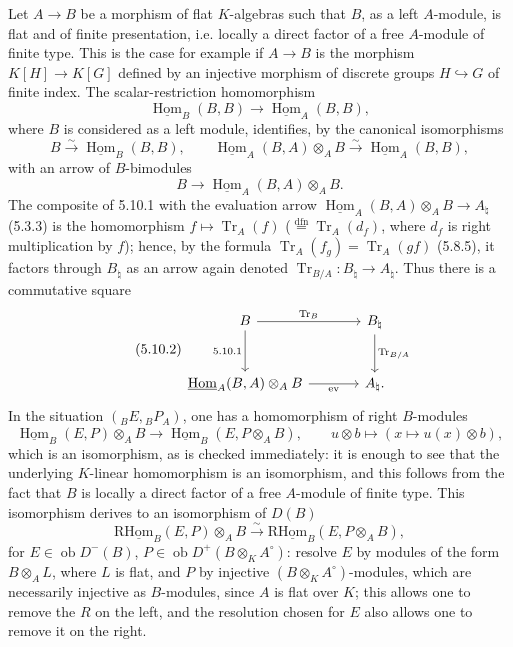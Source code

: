 \documentclass[11pt]{article}
\providecommand{\uHom}{\underline{\Hom}}
\DeclareMathOperator{\Hom}{Hom}
\newcommand{\ob}{\operatorname{ob}}
\providecommand{\Tr}{\operatorname{Tr}}
\providecommand{\Tr}{\operatorname{Tr}}
\providecommand{\Tr}{\operatorname{Tr}}
\providecommand{\Hom}{\operatorname{Hom}}
\providecommand{\ob}{\operatorname{ob}}
\providecommand{\Tr}{\operatorname{Tr}}
\providecommand{\Hom}{\operatorname{Hom}}
\providecommand{\Tr}{\operatorname{Tr}}
\begin{document}
Let $A\to B$ be a morphism of flat $K$-algebras such that $B$, as a left $A$-module, is flat and of finite presentation, i.e. locally a direct factor of a free $A$-module of finite type. This is the case for example if $A\to B$ is the morphism $K[H]\to K[G]$ defined by an injective morphism of discrete groups $H\hookrightarrow G$ of finite index. The scalar-restriction homomorphism
\[
\uHom_B(B,B)\longrightarrow\uHom_A(B,B),
\]
where $B$ is considered as a left module, identifies, by the canonical isomorphisms
\[
B\xrightarrow{\sim}\uHom_B(B,B),\qquad \uHom_A(B,A)\otimes_AB\xrightarrow{\sim}\uHom_A(B,B),
\]
with an arrow of $B$-bimodules
\begin{equation}\tag{5.10.1}
B\longrightarrow\uHom_A(B,A)\otimes_AB.
\end{equation}
The composite of 5.10.1 with the evaluation arrow $\uHom_A(B,A)\otimes_AB\to A_\natural$ (5.3.3) is the homomorphism $f\mapsto\Tr_A(f)$ ($\stackrel{\mathrm{dfn}}{=}\Tr_A(d_f)$, where $d_f$ is right multiplication by $f$); hence, by the formula $\Tr_A(f_g)=\Tr_A(gf)$ (5.8.5), it factors through $B_\natural$ as an arrow again denoted $\Tr_{B/A}:B_\natural\to A_\natural$. Thus there is a commutative square
\begin{equation}\tag{5.10.2}
\begin{tikzcd}[column sep=large,row sep=large]
B \arrow[r,"\Tr_B"] \arrow[d,"5.10.1"'] & B_\natural \arrow[d,"\Tr_{B/A}"]\\
\uHom_A(B,A)\otimes_AB \arrow[r,"\mathrm{ev}"'] & A_\natural .
\end{tikzcd}
\end{equation}
In the situation $({}_BE,{}_BP_A)$, one has a homomorphism of right $B$-modules
\begin{equation}\tag{5.10.3}
\uHom_B(E,P)\otimes_AB\longrightarrow\uHom_B(E,P\otimes_AB),\qquad
u\otimes b\longmapsto(x\longmapsto u(x)\otimes b),
\end{equation}
which is an isomorphism, as is checked immediately: it is enough to see that the underlying $K$-linear homomorphism is an isomorphism, and this follows from the fact that $B$ is locally a direct factor of a free $A$-module of finite type. This isomorphism derives to an isomorphism of $D(B)$
\begin{equation}\tag{5.10.4}
\mathrm{R}\underline{\mathrm{Hom}}_B(E,P)\otimes_AB\xrightarrow{\sim}\mathrm{R}\underline{\mathrm{Hom}}_B(E,P\otimes_AB),
\end{equation}
for $E\in\ob D^-(B)$, $P\in\ob D^+(B\otimes_KA^\circ)$: resolve $E$ by modules of the form $B\otimes_AL$, where $L$ is flat, and $P$ by injective $(B\otimes_KA^\circ)$-modules, which are necessarily injective as $B$-modules, since $A$ is flat over $K$; this allows one to remove the $R$ on the left, and the resolution chosen for $E$ also allows one to remove it on the right.
\end{document}
